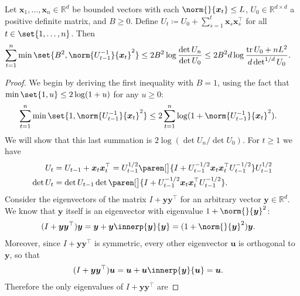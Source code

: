 \documentclass{article}
\renewcommand{\vec}[1]{\bm{#1}}
\newcommand{\defeq}{\coloneq}
\newcommand{\inv}[1]{#1^{-1}}
\newcommand{\Real}{\mathds{R}}
\DeclareMathOperator{\tr}{tr}
\DeclarePairedDelimiter{\paren}()
\providecommand\transp{\top}
\let\transpsymbol\transp
\renewcommand{\transp}[1]{#1^\transpsymbol}
\begin{document}
\begin{lemma}\label{lemma:elliptical-potential}
  Let $\vec x_1,\dotsc,\vec x_n \in \Real^d$ be bounded vectors with each
  $\norm{}{\vec x_t} \le L$, $U_0\in\Real^{d\times d}$ a positive
  definite matrix, and $B \ge 0$.  Define
  $U_t \defeq U_0 + \sum_{s=1}^t \vec x_s \transp{\vec x_s}$ for all
  $t\in\set{1,\dotsc,n}$.  Then
  \begin{align*}
    \sum_{t=1}^n\min\set{B^2, \norm{\inv{U_{t-1}}}{\vec x_t}^2}
    &\le 2B^2 \log\frac{\det U_n}{\det U_0}
      \le 2B^2d \log\frac{\tr U_0+nL^2}{d\det^{1/d} U_0}.
  \end{align*}
\end{lemma}

\begin{proof}
  We begin by deriving the first inequality with $B=1$, using the fact
  that $\min\set{1, u} \le 2\log(1+u)$ for any $u \ge 0$:
  \begin{align*}
    \sum_{t=1}^n\min\set{1, \norm{\inv{U_{t-1}}}{\vec x_t}^2}
    &\le 2 \sum_{t=1}^n \log(1 + \norm{\inv{U_{t-1}}}{\vec x_t}^2).
  \end{align*}
  We will show that this last summation is $2\log(\det U_n/\det
  U_0)$.  For $t \ge 1$ we have
  \begin{align*}
    U_t &= U_{t-1} + \vec x_t \transp{\vec x_t}
         = U_{t-1}^{1/2}
         \paren[\big]{I + U_{t-1}^{-1/2} \vec x_t \transp{\vec x_t} U_{t-1}^{-1/2}}
         U_{t-1}^{1/2} \\
    \det U_t &=\det U_{t-1}
              \det\paren[\big]{I +
              U_{t-1}^{-1/2} \vec x_t \transp{\vec x_t}
              U_{t-1}^{-1/2}}.
  \end{align*}
  Consider the eigenvectors of the matrix $I + \vec y \transp{\vec y}$
  for an arbitrary vector $\vec y \in \Real^d$.  We know that $\vec y$
  itself is an eigenvector with eigenvalue $1+\norm{}{\vec y}^2$:
  \begin{align*}
    (I + \vec y \transp{\vec y}) \vec y
    &= \vec y + \vec y \innerp{\vec y}{\vec y} = (1+\norm{}{\vec y}^2)\vec y.
  \end{align*}
  Moreover, since $I + \vec y \transp{\vec y}$ is symmetric, every
  other eigenvector $\vec u$ is orthogonal to $\vec y$, so that
  \begin{align*}
    (I + \vec y \transp{\vec y}) \vec u
    &= \vec u + \vec u \innerp{\vec y}{\vec u} = \vec u.
  \end{align*}
  Therefore the only eigenvalues of $I + \vec y \transp{\vec y}$ are

\end{proof}
\end{document}
